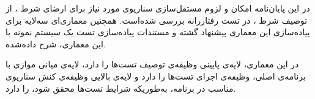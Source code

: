 
در این پایان‌نامه امکان و لزوم مستقل‌سازی سناریوی مورد نیاز برای ارضای
شرط ، از توصیف شرط ، در تست رفتاررانه بررسی
شده‌است. همچنین
معماری‌ای سه‌لایه برای پیاده‌سازی این معماری پیشنهاد گشته و مستندات پیاده‌سازی تست یک
سیستم نمونه با این معماری، شرح داده‌شده.

در این معماری، لایه‌ی پایینی وظیفه‌ی توصیف تست‌ها را دارد، لایه‌ی میانی
موازی با برنامه‌ی اصلی، وظیفه‌ی اجرای تست‌ها را دارد و لایه‌ی بالایی وظیفه‌ی
کنش سناریوی مناسب در برنامه، به‌طوریکه شرایط تست‌ها محقق شود، را
دارد.
